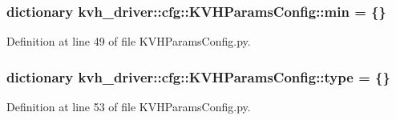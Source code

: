 \subsubsection[{min}]{\setlength{\rightskip}{0pt plus 5cm}dictionary {\bf kvh\-\_\-driver\-::cfg\-::\-K\-V\-H\-Params\-Config\-::min} = \{\}}\label{namespacekvh__driver_1_1cfg_1_1KVHParamsConfig_aeae5ca045aff2ebeeb7734307ab31f75}


\-Definition at line 49 of file \-K\-V\-H\-Params\-Config.\-py.

\subsubsection[{type}]{\setlength{\rightskip}{0pt plus 5cm}dictionary {\bf kvh\-\_\-driver\-::cfg\-::\-K\-V\-H\-Params\-Config\-::type} = \{\}}\label{namespacekvh__driver_1_1cfg_1_1KVHParamsConfig_a8fde5b49d6398909ddae684e2e4c02f6}


\-Definition at line 53 of file \-K\-V\-H\-Params\-Config.\-py.

